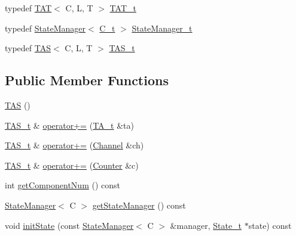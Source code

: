 \begin{DoxyCompactItemize}
\item 
typedef \mbox{\hyperlink{classgraphsat_1_1_t_a_t}{T\+AT}}$<$ C, L, T $>$ \mbox{\hyperlink{classgraphsat_1_1_t_a_s_a5b94c589a76c074601aea1f18bd3d3fe}{T\+A\+T\+\_\+t}}
\item 
typedef \mbox{\hyperlink{classgraphsat_1_1_state_manager}{State\+Manager}}$<$ \mbox{\hyperlink{classgraphsat_1_1_t_a_s_a05b063b91c0ab2a4f94380de78344d72}{C\+\_\+t}} $>$ \mbox{\hyperlink{classgraphsat_1_1_t_a_s_ad7b4fb0904029e47aa4ea38fdc0c6ca6}{State\+Manager\+\_\+t}}
\item 
typedef \mbox{\hyperlink{classgraphsat_1_1_t_a_s}{T\+AS}}$<$ C, L, T $>$ \mbox{\hyperlink{classgraphsat_1_1_t_a_s_aecb0fd9555b0cf9c3e73927d32a437d7}{T\+A\+S\+\_\+t}}
\end{DoxyCompactItemize}
\subsection*{Public Member Functions}
\begin{DoxyCompactItemize}
\item 
\mbox{\hyperlink{classgraphsat_1_1_t_a_s_a334b713c32b2a690a51ee6d16cd8fe05}{T\+AS}} ()
\item 
\mbox{\hyperlink{classgraphsat_1_1_t_a_s_aecb0fd9555b0cf9c3e73927d32a437d7}{T\+A\+S\+\_\+t}} \& \mbox{\hyperlink{classgraphsat_1_1_t_a_s_aa2c66c2762b7627ff529f798bcb831b3}{operator+=}} (\mbox{\hyperlink{classgraphsat_1_1_t_a_s_a74d326d2d6c5868f7394bfd460544a3b}{T\+A\+\_\+t}} \&ta)
\item 
\mbox{\hyperlink{classgraphsat_1_1_t_a_s_aecb0fd9555b0cf9c3e73927d32a437d7}{T\+A\+S\+\_\+t}} \& \mbox{\hyperlink{classgraphsat_1_1_t_a_s_a4cb62485bc1a7e3ffa1dd5fb9e4262ac}{operator+=}} (\mbox{\hyperlink{structgraphsat_1_1_channel}{Channel}} \&ch)
\item 
\mbox{\hyperlink{classgraphsat_1_1_t_a_s_aecb0fd9555b0cf9c3e73927d32a437d7}{T\+A\+S\+\_\+t}} \& \mbox{\hyperlink{classgraphsat_1_1_t_a_s_acf1638e781a91e538cd303679901ce11}{operator+=}} (\mbox{\hyperlink{classgraphsat_1_1_counter}{Counter}} \&c)
\item 
int \mbox{\hyperlink{classgraphsat_1_1_t_a_s_a29d0f28a414aaa455a99a958642aac1c}{get\+Component\+Num}} () const
\item 
\mbox{\hyperlink{classgraphsat_1_1_state_manager}{State\+Manager}}$<$ C $>$ \mbox{\hyperlink{classgraphsat_1_1_t_a_s_aa41dff4842c8b559c77d87ff2b497438}{get\+State\+Manager}} () const
\item 
void \mbox{\hyperlink{classgraphsat_1_1_t_a_s_a0db4b452d57fd2096eb7a5fb4e221dc7}{init\+State}} (const \mbox{\hyperlink{classgraphsat_1_1_state_manager}{State\+Manager}}$<$ C $>$ \&manager, \mbox{\hyperlink{classgraphsat_1_1_t_a_s_a21e6a612eebc293b90e198d4adf25f0f}{State\+\_\+t}} $\ast$state) const
\end{DoxyCompactItemize}
